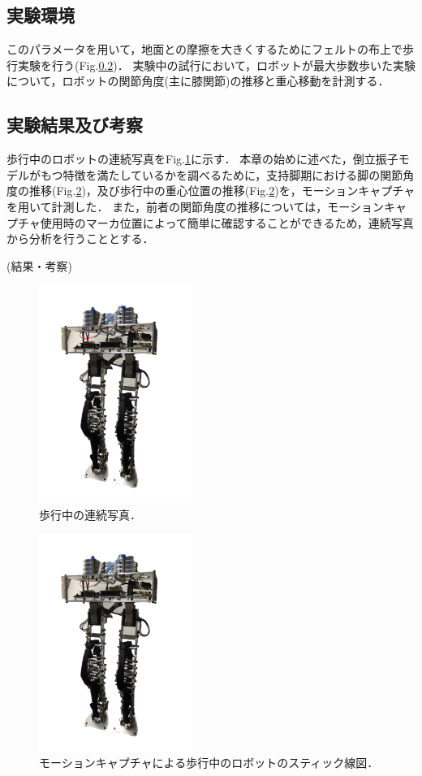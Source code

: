 \subsection{実験環境}
このパラメータを用いて，地面との摩擦を大きくするためにフェルトの布上で歩行実験を行う(Fig.\ref{})．
実験中の試行において，ロボットが最大歩数歩いた実験について，ロボットの関節角度(主に膝関節)の推移と重心移動を計測する．

\subsection{実験結果及び考察}
歩行中のロボットの連続写真をFig.\ref{photoseries}に示す．
本章の始めに述べた，倒立振子モデルがもつ特徴を満たしているかを調べるために，支持脚期における脚の関節角度の推移(Fig.\ref{motioncapture})，及び歩行中の重心位置の推移(Fig.\ref{motioncapture})を，モーションキャプチャを用いて計測した．
また，前者の関節角度の推移については，モーションキャプチャ使用時のマーカ位置によって簡単に確認することができるため，連続写真から分析を行うこととする．

(結果・考察)

\begin{figure}[htbp]
 \centering
 \includegraphics[clip,width=5.0cm]{./fig/robot.png} %
    \caption{歩行中の連続写真．\label{photoseries}}
\end{figure}

\begin{figure}[htbp]
 \centering
 \includegraphics[clip,width=5.0cm]{./fig/robot.png} %
    \caption{モーションキャプチャによる歩行中のロボットのスティック線図．\label{motioncapture}}
\end{figure}

